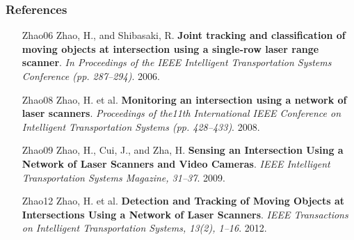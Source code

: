 \documentclass[table]{beamer}
\begin{document}
\frame
{
	\frametitle{References}
		\footnotesize{
	\begin{itemize}[leftmargin=.6in]
		\item [Zhao06] Zhao, H., and Shibasaki, R. \textbf{Joint tracking and classification of moving objects at intersection using a single-row laser range scanner}. \textit{In Proceedings of the IEEE Intelligent Transportation Systems Conference (pp. 287–294)}. 2006.
		\item [Zhao08] Zhao, H. et al.\textbf{ Monitoring an intersection using a network of laser scanners}. \textit{Proceedings of the11th International IEEE Conference on Intelligent Transportation Systems (pp. 428–433)}. 2008.
		\item [Zhao09] Zhao, H., Cui, J., and Zha, H. \textbf{Sensing an Intersection Using a Network of Laser Scanners and Video Cameras}. \textit{IEEE Intelligent Transportation Systems Magazine, 31–37}. 2009.
		\item [Zhao12] Zhao, H. et al. \textbf{Detection and Tracking of Moving Objects at Intersections Using a Network of Laser Scanners}. \textit{IEEE Transactions on Intelligent Transportation Systems, 13(2), 1–16}. 2012.

	\end{itemize}	
	}
}

%
%

%
%
%

%
%
%
%
\end{document}
